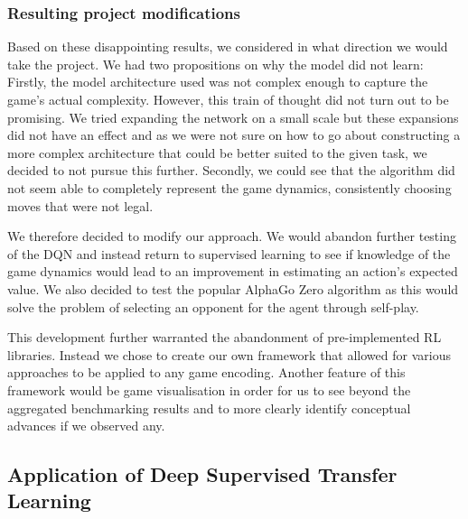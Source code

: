 \documentclass[12pt,a4paper]{article}
\begin{document}
{\subsubsection{Resulting project modifications}
Based on these disappointing results, we considered in what direction we would take the project. We had two propositions on why the model did not learn: Firstly, the model architecture used was not complex enough to capture the game’s actual complexity. However, this train of thought did not turn out to be promising. We tried expanding the network on a small scale but these expansions did not have an effect and as we were not sure on how to go about constructing a more complex architecture that could be better suited to the given task, we decided to not pursue this further. Secondly, we could see that the algorithm did not seem able to completely represent the game dynamics, consistently choosing moves that were not legal.

We therefore decided to modify our approach. We would abandon further testing of the DQN and instead return to supervised learning to see if knowledge of the game dynamics would lead to an improvement in estimating an action’s expected value. We also decided to test the popular AlphaGo Zero algorithm as this would solve the problem of selecting an opponent for the agent through self-play. 

This development further warranted the abandonment of pre-implemented RL libraries. Instead we chose to create our own framework that allowed for various approaches to be applied to any game encoding. Another feature of this framework would be game visualisation in order for us to see beyond the aggregated benchmarking results and to more clearly identify conceptual advances if we observed any.


\subsection{Application of Deep Supervised Transfer Learning}
}
\end{document}

